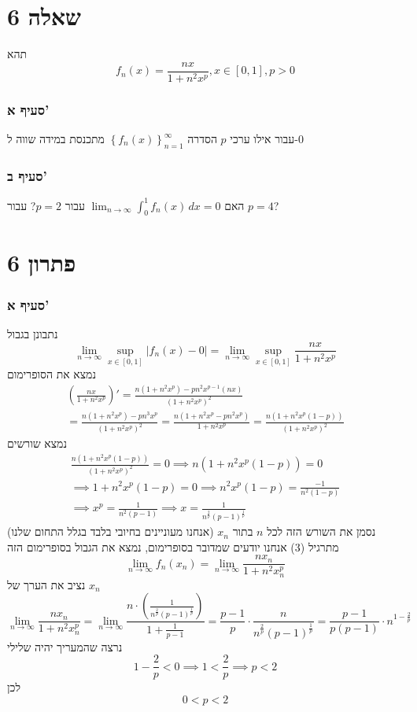 \documentclass[12pt, titlepage]{article}
\begin{document}
\part*{שאלה 6}
תהא
\[
    f_n(x) = \frac{nx}{1+n^2x^p}, x\in[0,1], p>0
\]
\section*{סעיף א'}
עבור אילו ערכי $p$ הסדרה $\left\{f_n(x)\right\}^\infty_{n=1}$ מתכנסת במידה שווה ל-$0$
\section*{סעיף ב'}
האם $\lim_{n\to\infty} \int_0^1 f_n(x)\,dx =0$ עבור $p=2$? עבור $p=4$?
\part*{פתרון 6}
\section*{סעיף א'}
נתבונן בגבול
\[
    \lim_{n\to\infty} \sup_{x\in\left[0,1\right]} \left|f_{n}\left(x\right)-0\right| = \lim_{n\to\infty} \sup_{x\in\left[0,1\right]} \frac{nx}{1+n^2x^p} 
\]
נמצא את הסופרימום
\begin{gather*}
    \left(\frac{nx}{1+n^2x^p}\right)' = \frac{n\left(1+n^2x^p\right)-pn^2x^{p-1}\left(nx\right)}{\left(1+n^2x^p\right)^2}\\
    = \frac{n\left(1+n^2x^p\right)-pn^3x^p}{\left(1+n^2x^p\right)^2} = \frac{n\left(1+n^2x^p-pn^2x^p\right)}{1+n^2x^p} = \frac{n\left(1+n^2x^p\left(1-p\right)\right)}{\left(1+n^2x^p\right)^2}
\end{gather*}
נמצא שורשים
\begin{gather*}
    \frac{n\left(1+n^2x^p\left(1-p\right)\right)}{\left(1+n^2x^p\right)^2} = 0 \implies n\left(1+n^2x^p\left(1-p\right)\right) = 0 \\
    \implies 1+n^2x^p\left(1-p\right) = 0 \implies n^2x^p\left(1-p\right) = \frac{-1}{n^2\left(1-p\right)}\\
    \implies x^p = \frac{1}{n^2\left(p-1\right)} \implies  x = \frac{1}{n^{\frac{2}{p}}\left(p-1\right)^{\frac{1}{p}}}
\end{gather*}
נסמן את השורש הזה לכל $n$ בתור $x_n$ (אנחנו מעוניינים בחיובי בלבד בגלל התחום שלנו)\\
מתרגיל (3) אנחנו יודעים שמדובר בסופרימום, נמצא את הגבול בסופרימום הזה
\[
    \lim_{n\to\infty} f_n(x_n) = \lim_{n\to\infty} \frac{nx_n}{1+n^2x_n^p}
\]
נציב את הערך של $x_n$
\[
    \lim_{n\to\infty} \frac{nx_n}{1+n^2x_n^p} = \lim_{n\to\infty} \frac{n\cdot\left(\frac{1}{n^{\frac{2}{p}}\left(p-1\right)^{\frac{1}{p}}}\right)}{1+\frac{1}{p-1}} = \frac{p-1}{p} \cdot \frac{n}{n^{\frac{2}{p}}\left(p-1\right)^{\frac{1}{p}}} = \frac{p-1}{p(p-1)} \cdot n^{1-\frac{2}{p}}
\]
נרצה שהמעריך יהיה שלילי
\[
    1-\frac{2}{p}<0 \implies 1 < \frac{2}{p} \implies p<2
\]
לכן
\[
    \boxed{0<p<2}
\]
\end{document}
